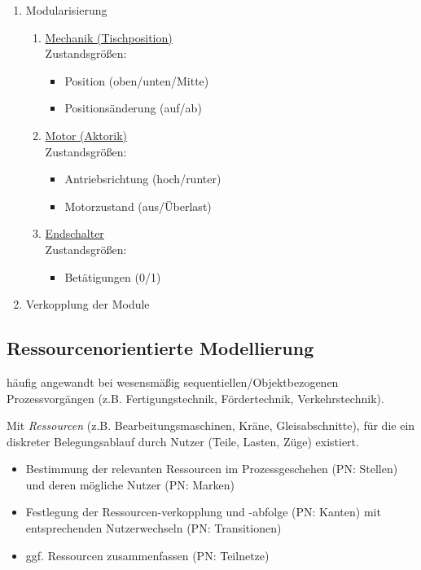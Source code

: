 \begin{enumerate}
	\item Modularisierung
	\begin{enumerate}
		\item \underline{Mechanik (Tischposition)}\\
		Zustandsgrößen:
		\begin{itemize}
			\item Position (oben/unten/Mitte)
			\item Positionsänderung (auf/ab)
		\end{itemize}
		\item \underline{Motor (Aktorik)}\\
		Zustandsgrößen:
		\begin{itemize}
			\item Antriebsrichtung (hoch/runter)
			\item Motorzustand (aus/Überlast)
		\end{itemize}
		\item \underline{Endschalter}\\
		Zustandsgrößen:
		\begin{itemize}
			\item Betätigungen (0/1)
		\end{itemize}
	\end{enumerate}
	\item Verkopplung der Module
\end{enumerate}

\subsection{Ressourcenorientierte Modellierung}
häufig angewandt bei wesensmäßig sequentiellen/Objektbezogenen Prozessvorgängen (z.B. Fertigungstechnik, Fördertechnik, Verkehrstechnik).

Mit \textit{Ressourcen} (z.B. Bearbeitungsmaschinen, Kräne, Gleisabschnitte), für die ein diskreter Belegungsablauf durch Nutzer (Teile, Lasten, Züge) existiert.

\begin{itemize}
	\item Bestimmung der relevanten Ressourcen im Prozessgeschehen (PN: Stellen) und deren mögliche Nutzer (PN: Marken)
	\item Festlegung der Ressourcen-verkopplung und -abfolge (PN: Kanten) mit entsprechenden Nutzerwechseln (PN: Transitionen)
	\item ggf. Ressourcen zusammenfassen (PN: Teilnetze) 
\end{itemize}

